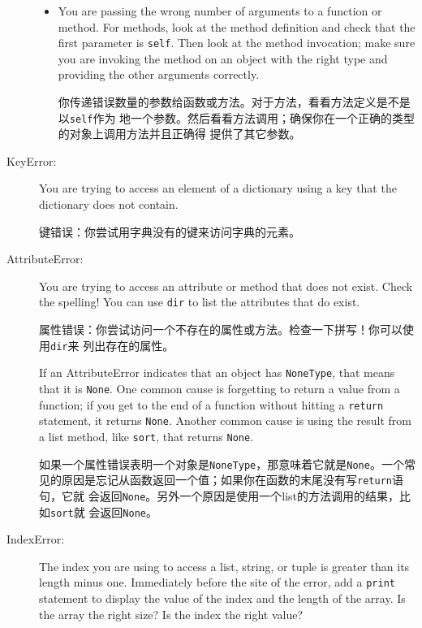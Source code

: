 \documentclass[10pt]{book}
\begin{document}
\begin{CJK}{UTF8}{gbsn}
\begin{description}
\begin{itemize}
\item You are passing the wrong number of arguments to a function or method.
For methods, look at the method definition and
check that the first parameter is {\tt self}.  Then look at the
method invocation; make sure you are invoking the method on an
object with the right type and providing the other arguments
correctly.

你传递错误数量的参数给函数或方法。对于方法，看看方法定义是不是以{\tt self}作为
地一个参数。然后看看方法调用；确保你在一个正确的类型的对象上调用方法并且正确得
提供了其它参数。

\end{itemize}

\item[KeyError:]  You are trying to access an element of a dictionary
using a key that the dictionary does not contain.

键错误：你尝试用字典没有的键来访问字典的元素。

\item[AttributeError:] You are trying to access an attribute or method
that does not exist.  Check the spelling!  You can use
{\tt dir} to list the attributes that do exist.

属性错误：你尝试访问一个不存在的属性或方法。检查一下拼写！你可以使用{\tt dir}来
列出存在的属性。

If an AttributeError indicates that an object has {\tt NoneType},
that means that it is {\tt None}.  One common cause is forgetting
to return a value from a function; if you get to the end of
a function without hitting a {\tt return} statement, it returns
{\tt None}.  Another common cause is using the result from
a list method, like {\tt sort}, that returns {\tt None}.

如果一个属性错误表明一个对象是{\tt NoneType}，那意味着它就是{\tt None}。一个常
见的原因是忘记从函数返回一个值；如果你在函数的末尾没有写{\tt return}语句，它就
会返回{\tt None}。另外一个原因是使用一个list的方法调用的结果，比如{\tt sort}就
会返回{\tt None}。

\item[IndexError:] The index you are using
to access a list, string, or tuple is greater than
its length minus one.  Immediately before the site of the error,
add a {\tt print} statement to display
the value of the index and the length of the array.
Is the array the right size?  Is the index the right value?


\end{description}
\end{CJK}
\end{document}
